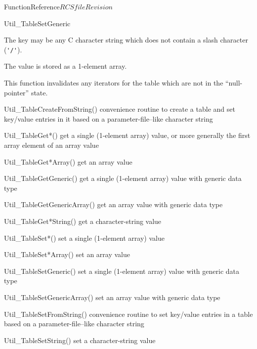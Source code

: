 \begin{cactuspart}{FunctionReference}{$RCSfile$}{$Revision$}
\begin{FunctionDescription}{Util\_TableSetGeneric}
\begin{Discussion}
The key may be any C character string which does not contain a slash
character (\verb|'/'|).

The value is stored as a 1-element array.

This function invalidates any iterators for the table which are
not in the ``null-pointer'' state.
\end{Discussion}

\begin{SeeAlsoSection}
\begin{SeeAlso}{Util\_TableCreateFromString()}
convenience routine to create a table and set key/value entries
in it based on a parameter-file--like character string
\end{SeeAlso}
\begin{SeeAlso}{Util\_TableGet*()}
get a single (1-element array) value,
or more generally the first array element of an array value
\end{SeeAlso}
\begin{SeeAlso}{Util\_TableGet*Array()}
get an array value
\end{SeeAlso}
\begin{SeeAlso}{Util\_TableGetGeneric()}
get a single (1-element array) value with generic data type
\end{SeeAlso}
\begin{SeeAlso}{Util\_TableGetGenericArray()}
get an array value with generic data type
\end{SeeAlso}
\begin{SeeAlso}{Util\_TableGet*String()}
get a character-string value
\end{SeeAlso}
\begin{SeeAlso}{Util\_TableSet*()}
set a single (1-element array) value
\end{SeeAlso}
\begin{SeeAlso}{Util\_TableSet*Array()}
set an array value
\end{SeeAlso}
\begin{SeeAlso}{Util\_TableSetGeneric()}
set a single (1-element array) value with generic data type
\end{SeeAlso}
\begin{SeeAlso}{Util\_TableSetGenericArray()}
set an array value with generic data type
\end{SeeAlso}
\begin{SeeAlso}{Util\_TableSetFromString()}
convenience routine to set key/value entries in a table based on a
parameter-file--like character string
\end{SeeAlso}
\begin{SeeAlso}{Util\_TableSetString()}
set a character-string value
\end{SeeAlso}
\end{SeeAlsoSection}


\end{FunctionDescription}
\end{cactuspart}
